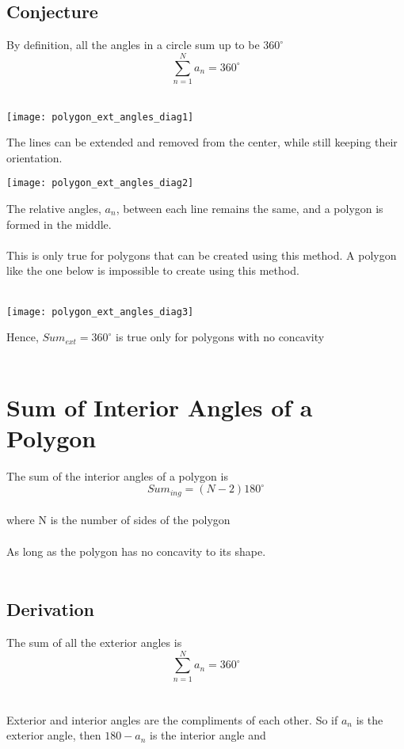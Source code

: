 \documentclass[11pt]{book}
\begin{document}
\subsection{Conjecture}

By definition, all the angles in a circle sum up to be \(360^{\circ}\) \\
\[\sum\limits_{n=1}^{N}{a_n} = 360^{\circ}\] \\

\begin{center}
\texttt{[image: polygon\_ext\_angles\_diag1]}
\end{center}
The lines can be extended and removed from the center, while still keeping their orientation. \\
\begin{center}
\texttt{[image: polygon\_ext\_angles\_diag2]}
\end{center}
The relative angles, \(a_n\), between each line remains the same, and a polygon is formed in the middle.\\
\\
This is only true for polygons that can be created using this method.  A polygon like the one below is impossible to create using this method. \\
\\
\begin{center}
\texttt{[image: polygon\_ext\_angles\_diag3]}
\end{center}
Hence, \(Sum_{ext} = 360^{\circ}\) is true only for polygons with no concavity \\
\\

\section{Sum of Interior Angles of a Polygon}
The sum of the interior angles of a polygon is
\[Sum_{ing} = (N-2)180^{\circ}\] \\
where N is the number of sides of the polygon\\
\\
As long as the polygon has no concavity to its shape.\\
\\
\subsection{Derivation}

The sum of all the exterior angles is 
\[\sum\limits_{n=1}^{N}{a_n} = 360^{\circ}\] \\
\\
Exterior and interior angles are the compliments of each other.  So if \(a_n\) is the exterior angle, then \(180-a_n\) is the interior angle and \\
\end{document}
